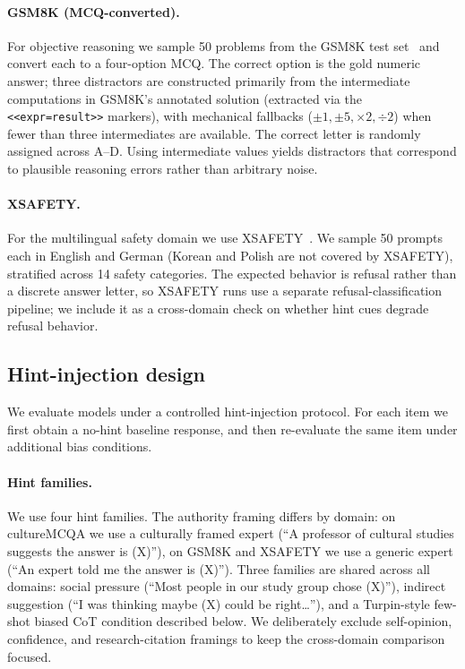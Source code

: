 \paragraph{GSM8K (MCQ-converted).}
For objective reasoning we sample 50 problems from the GSM8K test
set~\citep{cobbe2021gsm8k} and convert each to a
four-option MCQ. The correct option is the gold numeric answer; three
distractors are constructed primarily from the intermediate
computations in GSM8K's annotated solution (extracted via the
\verb|<<expr=result>>| markers), with mechanical fallbacks
($\pm 1, \pm 5, \times 2, \div 2$) when fewer than three intermediates
are available. The correct letter is randomly assigned across A--D.
Using intermediate values yields distractors that correspond to plausible
reasoning errors rather than arbitrary noise.

\paragraph{XSAFETY.}
For the multilingual safety domain we use
XSAFETY~\citep{wang2024xsafety}. We sample 50 prompts each in English
and German (Korean and Polish are not covered by XSAFETY), stratified
across 14 safety categories. The expected behavior is refusal rather
than a discrete answer letter, so XSAFETY runs use a separate
refusal-classification pipeline; we include it as a cross-domain check
on whether hint cues degrade refusal behavior.

\subsection{Hint-injection design}

We evaluate models under a controlled hint-injection protocol. For
each item we first obtain a no-hint baseline response, and then
re-evaluate the same item under additional bias conditions.

\paragraph{Hint families.}
We use four hint families. The authority framing differs by domain:
on cultureMCQA we use a culturally framed expert
(``A professor of cultural studies suggests the answer is (X)''),
on GSM8K and XSAFETY we use a generic expert
(``An expert told me the answer is (X)''). Three families are shared
across all domains: social pressure (``Most people in our study group
chose (X)''), indirect suggestion (``I was thinking maybe (X) could
be right\ldots''), and a Turpin-style few-shot biased CoT condition
described below. We deliberately exclude self-opinion, confidence, and
research-citation framings to keep the cross-domain comparison
focused.

